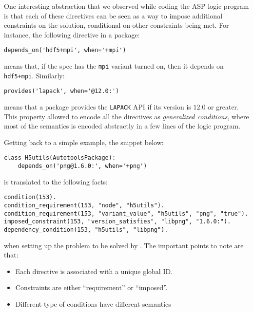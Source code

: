 One interesting abstraction that we observed while coding the ASP logic program is
that each of these directives can be seen as a way to impose additional constraints on
the solution, conditional on other constraints being met. For instance, the following
directive in a package:
%
\begin{verbatim}
depends_on('hdf5+mpi', when='+mpi')
\end{verbatim}
%
means that, if the spec has the {\tt mpi} variant turned on, then it depends on {\tt hdf5+mpi}. Similarly:
%
\begin{verbatim}
provides('lapack', when='@12.0:')
\end{verbatim}
%
means that a package provides the {\tt LAPACK} API if its version is $12.0$ or greater.
This property allowed to encode all the directives as \emph{generalized conditions}, where most of the semantics is encoded abstractly in a few lines of the logic program.

Getting back to a simple example, the snippet below:
%
\begin{verbatim}
class H5utils(AutotoolsPackage):
    depends_on('png@1.6.0:', when='+png')
\end{verbatim}
%
is translated to the following facts:
%
\begin{verbatim}
condition(153).
condition_requirement(153, "node", "h5utils").
condition_requirement(153, "variant_value", "h5utils", "png", "true").
imposed_constraint(153, "version_satisfies", "libpng", "1.6.0:").
dependency_condition(153, "h5utils", "libpng").
\end{verbatim}
%
when setting up the problem to be solved by \clingo. The important points to note are that:

\begin{itemize}
\item Each directive is associated with a unique global ID.
\item Constraints are either ``requirement'' or ``imposed''.
\item Different type of conditions have different semantics\footnotemark
\end{itemize}

